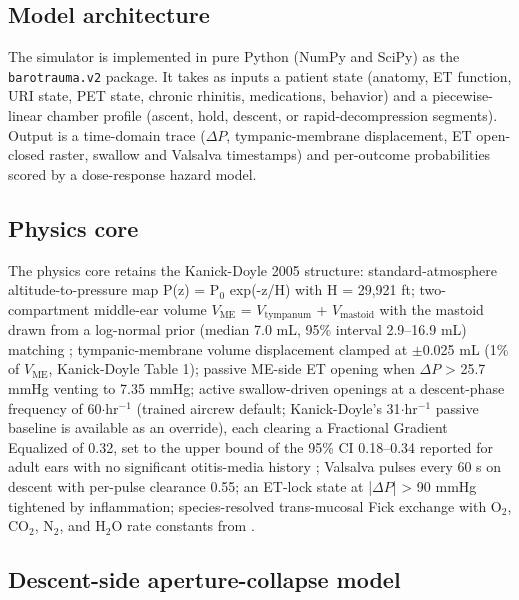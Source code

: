 \documentclass[11pt,a4paper]{article}
\begin{document}
\subsection{Model architecture}

The simulator is implemented in pure Python (NumPy and SciPy) as the \texttt{barotrauma.v2} package. It takes as inputs a patient state (anatomy, ET function, URI state, PET state, chronic rhinitis, medications, behavior) and a piecewise-linear chamber profile (ascent, hold, descent, or rapid-decompression segments). Output is a time-domain trace ($\Delta P$, tympanic-membrane displacement, ET open-closed raster, swallow and Valsalva timestamps) and per-outcome probabilities scored by a dose-response hazard model.

\subsection{Physics core}

The physics core retains the Kanick-Doyle 2005 structure: standard-atmosphere altitude-to-pressure map P(z) = P$_{0}$ exp(-z/H) with H = 29,921 ft; two-compartment middle-ear volume $V_{\mathrm{ME}}$ = $V_{\mathrm{tympanum}}$ + $V_{\mathrm{mastoid}}$ with the mastoid drawn from a log-normal prior (median 7.0 mL, 95\% interval 2.9--16.9 mL) matching \citet{Alper2011}; tympanic-membrane volume displacement clamped at $\pm$0.025 mL (1\% of $V_{\mathrm{ME}}$, Kanick-Doyle Table 1); passive ME-side ET opening when $\Delta P$ > 25.7 mmHg venting to 7.35 mmHg; active swallow-driven openings at a descent-phase frequency of 60$\cdot$hr$^{-1}$ (trained aircrew default; Kanick-Doyle's 31$\cdot$hr$^{-1}$ passive baseline is available as an override), each clearing a Fractional Gradient Equalized of 0.32, set to the upper bound of the 95\% CI 0.18--0.34 reported for adult ears with no significant otitis-media history \citep{Doyle2014}; Valsalva pulses every 60 s on descent with per-pulse clearance 0.55; an ET-lock state at |$\Delta P$| > 90 mmHg tightened by inflammation; species-resolved trans-mucosal Fick exchange with $\mathrm{O}_2$, $\mathrm{CO}_2$, $\mathrm{N}_2$, and $\mathrm{H}_2\mathrm{O}$ rate constants from \citep{Doyle2011}.

\subsection{Descent-side aperture-collapse model}
\end{document}
